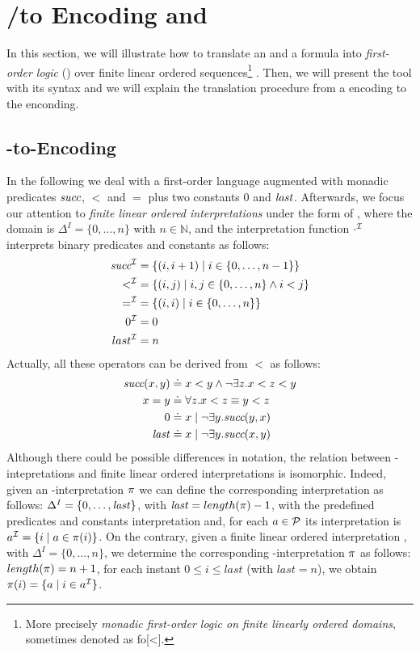\section{\LTLf/\PLTL to \FOL Encoding and \MONA}
In this section, we will illustrate how to translate an \LTLf and a \PLTL formula into \emph{first-order logic} (\FOL) over finite linear ordered sequences\footnote{More precisely \textit{monadic first-order logic on finite linearly ordered domains}, sometimes denoted as \sc fo[<].} \citep{de2013linear,zpv2018}. Then, we will present the \MONA tool with its syntax and we will explain the translation procedure from a \FOL encoding to the \MONA enconding.
\subsection{\LTLf-to-\FOL Encoding}\label{subsec:ltlf-to-fol}
In the following we deal with a first-order language augmented with monadic predicates $\suc$, $<$ and $=$ plus two constants $0$ and $\last$. Afterwards, we focus our attention to \emph{finite linear ordered \FOL interpretations} under the form of \folInter, where the domain is $\Delta^{I} = \{0,\dots,n\}$ with $n \in \mathbb{N}$, and the interpretation function $\cdot^{\I}$ interprets binary predicates and constants as follows:
\begin{align}
\begin{aligned}
\suc^{\I} &= \{ (i,i+1) \mid i \in \{0,\dots,n-1\}\}\\
<^{\I} &= \{ (i,j) \mid i,j \in \{0,\dots,n\} \lAND i<j\}\\
=^{\I} &= \{ (i,i) \mid i \in \{0,\dots,n\}\}\\
0^{\I} &= 0\\
last^{\I} &= n
\label{monadic-predicates}
\end{aligned}
\end{align}
Actually, all these operators can be derived from $<$ as follows:
\begin{align*}
\suc(x,y) &\doteq x<y \lAND \lnot \exists z. x<z<y\\
x=y &\doteq \forall z. x<z \equiv y<z\\
0 &\doteq x \mid \lnot \exists y.\suc(y,x)\\
\last &\doteq x \mid \lnot \exists y.\suc(x,y)
\end{align*}
Although there could be possible differences in notation, the relation between \LT-intepretations and finite linear ordered \FOL interpretations is isomorphic. Indeed, given an \LT-interpretation $\trace$ we can define the corresponding \FOL interpretation \folInter as follows: $\Delta^{I} = \{0,\dots,\last\}$, with $\last = length(\trace)-1$, with the predefined predicates and constants interpretation and, for each $a \in \P$ its interpretation is $a^{\I} = \{i \mid a \in \trace(i)\}$. On the contrary, given a finite linear ordered \FOL interpretation \folInter, with $\Delta^{I} = \{0,\dots,n\}$, we determine the corresponding \LT-interpretation $\trace$ as follows: $length(\trace) = n+1$, for each instant $0 \le i \le last$ (with $last = n$), we obtain $\trace(i)=\{a \mid i \in a^{\I}\}$.

